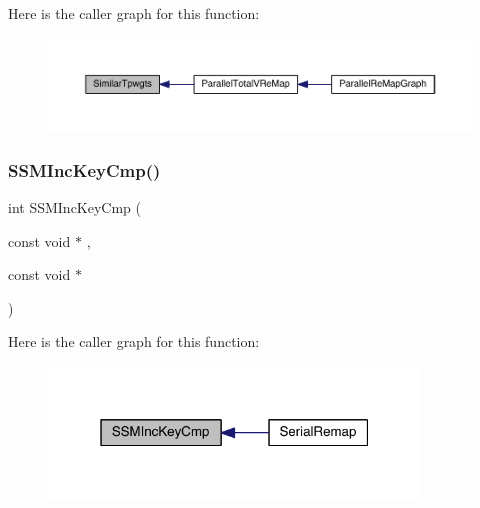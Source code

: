 Here is the caller graph for this function\+:\nopagebreak
\begin{figure}[H]
\begin{center}
\leavevmode
\includegraphics[width=350pt]{a00951_abfd66496e3aed0dff8e1c982c3ab11b3_icgraph}
\end{center}
\end{figure}
\mbox{\label{a00951_a2c29631a715f7bcea3b496782e0b6f70}} 
\subsubsection{\texorpdfstring{S\+S\+M\+Inc\+Key\+Cmp()}{SSMIncKeyCmp()}}
{\footnotesize\ttfamily int S\+S\+M\+Inc\+Key\+Cmp (\begin{DoxyParamCaption}\item[{const void $\ast$}]{,  }\item[{const void $\ast$}]{ }\end{DoxyParamCaption})}

Here is the caller graph for this function\+:\nopagebreak
\begin{figure}[H]
\begin{center}
\leavevmode
\includegraphics[width=280pt]{a00951_a2c29631a715f7bcea3b496782e0b6f70_icgraph}
\end{center}
\end{figure}
\mbox{\label{a00951_a7a5d889e87411c9e1d2093073fed1c81}} 
